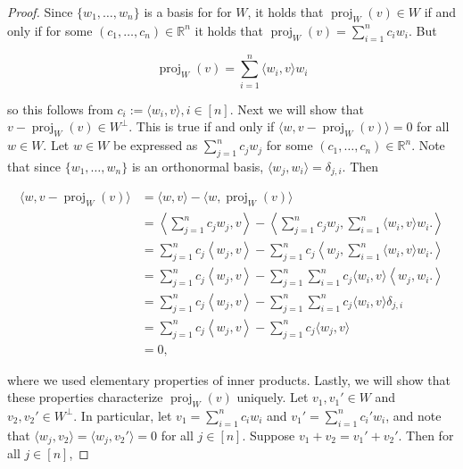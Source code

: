 \begin{proof}

Since \(\{w_1, \ldots, w_n\}\) is a basis for for \(W\), it holds that \(\operatorname{proj}_W(v) \in W\) if and only if for some \((c_1, \ldots, c_n) \in \mathbb{R}^n\) it holds that \( \operatorname{proj}_W(v) = \sum_{i=1}^n c_i w_i\). But

\[
 \operatorname{proj}_W(v) =  \sum_{i=1}^n \langle w_i, v \rangle w_i
\]

so this follows from \(c_i := \langle w_i, v \rangle, i \in [n]\). Next we will show that \(v - \operatorname{proj}_W(v) \in W^\perp\). This is true if and only if \(\langle w, v - \operatorname{proj}_W(v) \rangle = 0\) for all \(w \in W\). Let \(w \in W\) be expressed as \(\sum_{j=1}^n c_j w_j\) for some \((c_1, \ldots, c_n) \in \mathbb{R}^n\). Note that since \(\{w_1, \ldots, w_n\}\) is an orthonormal basis, \(\langle w_j, w_i \rangle = \delta_{j,i}\). Then

\begin{align*}
\langle w, v - \operatorname{proj}_W(v) \rangle &  = \langle w, v  \rangle - \langle w, \operatorname{proj}_W(v) \rangle 
\\ & = \left\langle \sum_{j=1}^n c_j w_j,  v \right\rangle - \left\langle \sum_{j=1}^n c_j w_j, \sum_{i=1}^n \langle w_i, v \rangle w_i. \right\rangle
\\ & = \sum_{j=1}^n  c_j \left\langle  w_j,  v \right\rangle -\sum_{j=1}^n c_j  \left\langle  w_j, \sum_{i=1}^n \langle w_i, v \rangle w_i. \right\rangle
\\ & = \sum_{j=1}^n  c_j \left\langle  w_j,  v \right\rangle -\sum_{j=1}^n \sum_{i=1}^n c_j  \langle w_i, v \rangle \left\langle  w_j,  w_i. \right\rangle
\\ & = \sum_{j=1}^n  c_j \left\langle  w_j,  v \right\rangle -\sum_{j=1}^n \sum_{i=1}^n c_j  \langle w_i, v \rangle \delta_{j,i}
\\ & = \sum_{j=1}^n  c_j \left\langle  w_j,  v \right\rangle - \sum_{j=1}^n c_j  \langle w_j, v \rangle 
\\ & = 0,
\end{align*}

where we used elementary properties of inner products. Lastly, we will show that these properties characterize \( \operatorname{proj}_W(v)\) uniquely. Let \(v_1, v_1' \in W\) and \(v_2, v_2' \in W^\perp\). In particular, let \(v_1 = \sum_{i=1}^n c_i w_i\) and \(v_1' = \sum_{i=1}^n c_i' w_i\), and note that \(\langle w_j , v_2 \rangle = \langle w_j, v_2' \rangle = 0\) for all \(j \in [n]\). Suppose \(v_1 + v_2 = v_1' + v_2'\). Then for all \(j \in [n]\),


\end{proof}
